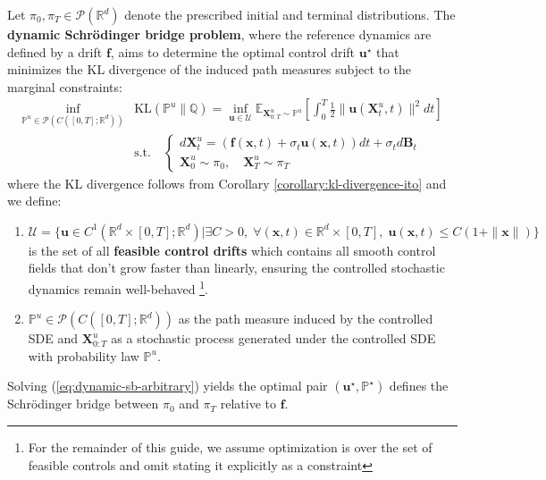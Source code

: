 \documentclass{article}
\begin{document}
\begin{definition}\label{def:dynamic-sb}
Let $\pi_0, \pi_T\in \mathcal{P}(\mathbb{R}^d)$ denote the prescribed initial and terminal distributions. The \textbf{dynamic Schrödinger bridge problem}, where the reference dynamics are defined by a drift $\boldsymbol{f}$, aims to determine the optimal control drift $\boldsymbol{u}^\star$ that minimizes the KL divergence of the induced path measures subject to the marginal constraints:
\begin{align}
    \inf_{\mathbb{P}^u\in \mathcal{P}(C([0,T];\mathbb{R}^d))}&\text{KL}(\mathbb{P}^u\|\mathbb{Q})= \inf_{\boldsymbol{u}\in \mathcal{U}}\mathbb{E}_{\boldsymbol{X}^u_{0:T}\sim \mathbb{P}^u}\left[\int_0^T\frac{1}{2}\|\boldsymbol{u}(\boldsymbol{X}^u_t,t)\|^2dt\right]\tag{Dynamic SB}\label{eq:dynamic-sb-arbitrary}\\
    &\text{s.t.}\quad \begin{cases}
        d\boldsymbol{X}^u_t=(\boldsymbol{f}(\boldsymbol{x},t)+\sigma_t\boldsymbol{u}(\boldsymbol{x},t))dt+\sigma_td\boldsymbol{B}_t\\
        \boldsymbol{X}^u_0\sim \pi_0, \quad \boldsymbol{X}^u_T\sim \pi_T
    \end{cases}\nonumber
\end{align}
where the KL divergence follows from Corollary \ref{corollary:kl-divergence-ito} and we define:
\begin{enumerate}
    \item [(i)] $\mathcal{U}=\{\boldsymbol{u}\in C^1(\mathbb{R}^d\times [0,T];\mathbb{R}^d)|\exists C> 0, \;\forall (\boldsymbol{x},t)\in \mathbb{R}^d\times [0,T], \;\boldsymbol{u}(\boldsymbol{x},t)\leq C(1+\|\boldsymbol{x}\|)\}$ is the set of all \textbf{feasible control drifts} which contains all smooth control fields that don’t grow faster than linearly, ensuring the controlled stochastic dynamics remain well-behaved \citep{nusken2021solving}\footnote{For the remainder of this guide, we assume optimization is over the set of feasible controls and omit stating it explicitly as a constraint}.
    \item [(ii)] $\mathbb{P}^u\in \mathcal{P}(C([0,T];\mathbb{R}^d))$ as the path measure induced by the controlled SDE and $\boldsymbol{X}^u_{0:T}$ as a stochastic process generated under the controlled SDE with probability law $\mathbb{P}^u$.
\end{enumerate}
Solving (\ref{eq:dynamic-sb-arbitrary}) yields the optimal pair $(\boldsymbol{u}^\star, \mathbb{P}^\star)$ defines the Schrödinger bridge between $\pi_0$ and $\pi_T$ relative to $\boldsymbol{f}$.
\end{definition}
\end{document}
